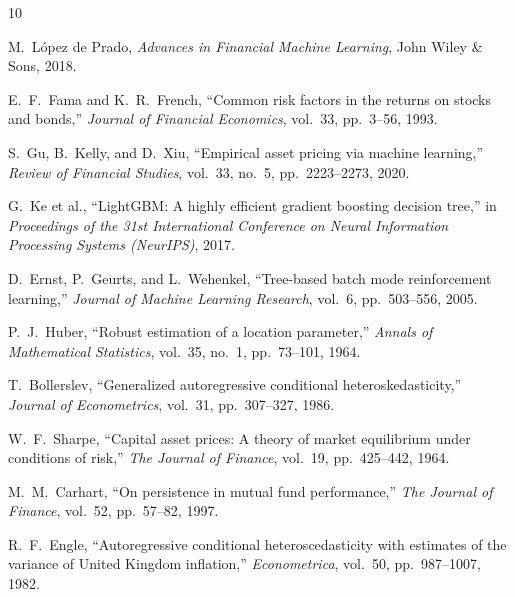 \documentclass[journal,10pt,twocolumn]{IEEEtran}
\begin{document}
\begin{thebibliography}{10}

 M.~L\'{o}pez de Prado, \emph{Advances in Financial Machine Learning}, John Wiley \& Sons, 2018.

 E.~F.~Fama and K.~R.~French, ``Common risk factors in the returns on stocks and bonds,'' \emph{Journal of Financial Economics}, vol.~33, pp.~3--56, 1993.

 S.~Gu, B.~Kelly, and D.~Xiu, ``Empirical asset pricing via machine learning,'' \emph{Review of Financial Studies}, vol.~33, no.~5, pp.~2223--2273, 2020.

 G.~Ke et al., ``LightGBM: A highly efficient gradient boosting decision tree,'' in \emph{Proceedings of the 31st International Conference on Neural Information Processing Systems (NeurIPS)}, 2017.

 D.~Ernst, P.~Geurts, and L.~Wehenkel, ``Tree-based batch mode reinforcement learning,'' \emph{Journal of Machine Learning Research}, vol.~6, pp.~503--556, 2005.

 P.~J.~Huber, ``Robust estimation of a location parameter,'' \emph{Annals of Mathematical Statistics}, vol.~35, no.~1, pp.~73--101, 1964.

 T.~Bollerslev, ``Generalized autoregressive conditional heteroskedasticity,'' \emph{Journal of Econometrics}, vol.~31, pp.~307--327, 1986.

 W.~F.~Sharpe, ``Capital asset prices: A theory of market equilibrium under conditions of risk,'' \emph{The Journal of Finance}, vol.~19, pp.~425--442, 1964.

 M.~M.~Carhart, ``On persistence in mutual fund performance,'' \emph{The Journal of Finance}, vol.~52, pp.~57--82, 1997.

 R.~F.~Engle, ``Autoregressive conditional heteroscedasticity with estimates of the variance of United Kingdom inflation,'' \emph{Econometrica}, vol.~50, pp.~987--1007, 1982.

\end{thebibliography}
\end{document}
